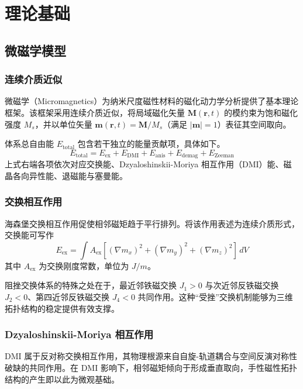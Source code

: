 \chapter{理论基础}

\section{微磁学模型}

\subsection{连续介质近似}
微磁学（Micromagnetics）为纳米尺度磁性材料的磁化动力学分析提供了基本理论框架。该框架采用连续介质近似，将局域磁化矢量 $\mathbf{M}(\mathbf{r}, t)$ 的模约束为饱和磁化强度 $M_s$，并以单位矢量 $\mathbf{m}(\mathbf{r}, t) = \mathbf{M}/M_s$（满足 $|\mathbf{m}| = 1$）表征其空间取向。

体系总自由能 $E_{\text{total}}$ 包含若干独立的能量贡献项，具体如下。
\begin{equation}
  E_{\text{total}} = E_{\text{ex}} + E_{\text{DMI}} + E_{\text{anis}} + E_{\text{demag}} + E_{\text{Zeeman}}
  \label{eq:total-energy}
\end{equation}
上式右端各项依次对应交换能、Dzyaloshinskii-Moriya 相互作用（DMI）能、磁晶各向异性能、退磁能与塞曼能。

\subsection{交换相互作用}
海森堡交换相互作用促使相邻磁矩趋于平行排列。将该作用表述为连续介质形式，交换能可写作
\begin{equation}
  E_{\text{ex}} = \int A_{\text{ex}} \left[ (\nabla m_x)^2 + (\nabla m_y)^2 + (\nabla m_z)^2 \right] \, dV
  \label{eq:exchange}
\end{equation}
其中 $A_{\text{ex}}$ 为交换刚度常数，单位为 $\si{J/m}$。

阻挫交换体系的特殊之处在于，最近邻铁磁交换 $J_1 > 0$ 与次近邻反铁磁交换 $J_2 < 0$、第四近邻反铁磁交换 $J_4 < 0$ 共同作用。这种“受挫”交换机制能够为三维拓扑结构的稳定提供有效支撑\cite{sallermann2023stability}。

\subsection{Dzyaloshinskii-Moriya 相互作用}
DMI 属于反对称交换相互作用，其物理根源来自自旋-轨道耦合与空间反演对称性破缺的共同作用。在 DMI 影响下，相邻磁矩倾向于形成垂直取向，手性磁性拓扑结构的产生即以此为微观基础。

